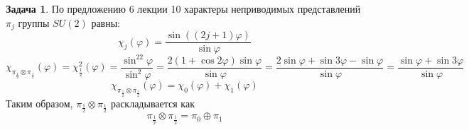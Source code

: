 \documentclass[12pt]{article}
\theoremstyle{definition}
\newtheorem{zad}{Задача}[section]
\begin{document}
\begin{zad}
По предложению 6 лекции 10 характеры неприводимых представлений $\pi_j$ группы $SU(2)$ равны:
\begin{equation}
    \chi_j(\varphi)=\frac{\sin((2j+1)\varphi)}{\sin\varphi}
\end{equation}
\begin{equation*}
    \chi_{\pi_\frac{1}{2}\otimes\pi_\frac{1}{2}}(\varphi)=\chi^2_{\frac{1}{2}}(\varphi)=\frac{\sin^22\varphi}{\sin^2\varphi}=\frac{2(1+\cos 2\varphi)\sin\varphi}{\sin\varphi}=\frac{2\sin\varphi+\sin 3\varphi-\sin\varphi}{\sin\varphi}=\frac{\sin\varphi+\sin3\varphi}{\sin\varphi}
\end{equation*}
\begin{equation}
    \chi_{\pi_\frac{1}{2}\otimes\pi_\frac{1}{2}}(\varphi)=\chi_0(\varphi)+\chi_1(\varphi)
\end{equation}
Таким образом, $\pi_{\frac{1}{2}}\otimes\pi_{\frac{1}{2}}$ раскладывается как
\begin{equation}
    \boxed{\pi_{\frac{1}{2}}\otimes\pi_{\frac{1}{2}}=\pi_0\oplus \pi_1}
\end{equation}
\end{zad}
\end{document}

